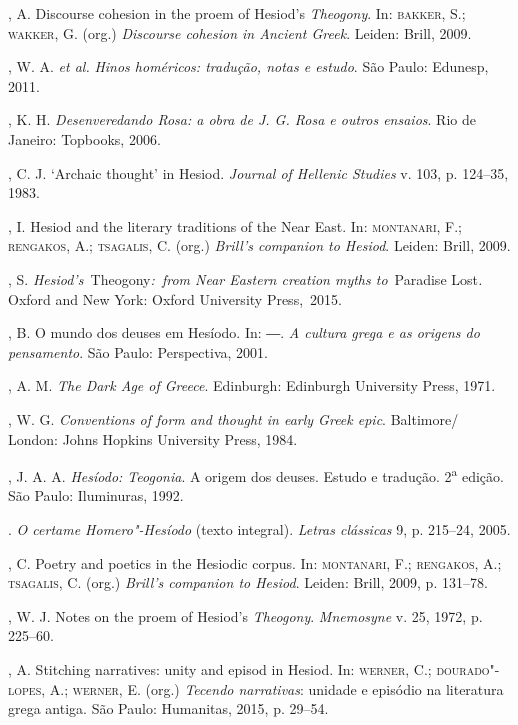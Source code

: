 \begin{bibliohedra}
, A. Discourse cohesion in the proem of Hesiod's
\emph{Theogony}. In: \textsc{bakker}, S.; \textsc{wakker}, G. (org.) \emph{Discourse
cohesion in Ancient Greek}. Leiden: Brill, 2009.

, W. A. \emph{et al.} \emph{Hinos homéricos: tradução, notas
e estudo}. São Paulo: Edunesp, 2011.

, K. H. \emph{Desenveredando Rosa: a obra de J. G. Rosa e
outros ensaios}. Rio de Janeiro: Topbooks, 2006.

, C. J. `Archaic thought' in Hesiod. \emph{Journal of Hellenic
Studies} v. 103, p. 124--35, 1983.

, I. Hesiod and the literary traditions of the Near East. In:
\textsc{montanari}, F.; \textsc{rengakos}, A.; \textsc{tsagalis}, C. (org.) \emph{Brill's companion
to Hesiod}. Leiden: Brill, 2009.

, S. \emph{Hesiod's~}Theogony\emph{:~from Near Eastern
creation myths to}~Paradise Lost\emph{.} Oxford and New York: Oxford
University Press,~2015.

, B. O mundo dos deuses em Hesíodo. In: ―. \emph{A cultura grega e
as origens do pensamento}. São Paulo: Perspectiva, 2001.

, A. M. \emph{The Dark Age of Greece}. Edinburgh: Edinburgh
University Press, 1971.

, W. G. \emph{Conventions of form and thought in early Greek
epic}. Baltimore/ London: Johns Hopkins University Press, 1984.

, J. A. A. \emph{Hesíodo: Teogonia}. A origem dos deuses. Estudo
e tradução. 2\textsuperscript{a} edição. São Paulo: Iluminuras, 1992.

\titidem. \emph{O certame Homero"-Hesíodo} (texto integral). \emph{Letras
clássicas} 9, p. 215--24, 2005.

, C. Poetry and poetics in the Hesiodic corpus. In: \textsc{montanari},
F.; \textsc{rengakos}, A.; \textsc{tsagalis}, C. (org.) \emph{Brill's companion to
Hesiod}. Leiden: Brill, 2009, p. 131--78.

, W. J. Notes on the proem of Hesiod's \emph{Theogony}.
\emph{Mnemosyne} v. 25, 1972, p. 225--60.

, A. Stitching narratives: unity and episod in Hesiod. In:
\textsc{werner}, C.; \textsc{dourado"-lopes}, A.; \textsc{werner}, E. (org.) \emph{Tecendo
narrativas}: unidade e episódio na literatura grega antiga. São Paulo:
Humanitas, 2015, p. 29--54.


\end{bibliohedra}
